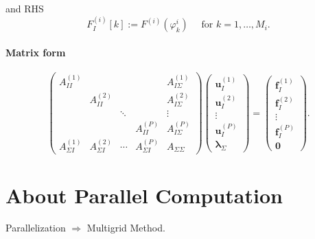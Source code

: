 and RHS
$$F_{I}^{(i)}[k]:=F^{(i)}\left(\varphi_{k}^{i}\right) \quad \text { for } k=1, \ldots, M_{i} .$$

\paragraph*{Matrix form}
$$\left(\begin{array}{ccccc}
    A_{I I}^{(1)} & & & & A_{I \Sigma}^{(1)} \\
    & A_{I I}^{(2)} & & & A_{I \Sigma}^{(2)} \\
    & & \ddots & & \vdots \\
    & & & A_{I I}^{(P)} & A_{I \Sigma}^{(P)} \\
    A_{\Sigma I}^{(1)} & A_{\Sigma I}^{(2)} & \cdots & A_{\Sigma I}^{(P)} & A_{\Sigma \Sigma}
    \end{array}\right)\left(\begin{array}{c}
    \boldsymbol{u}_{I}^{(1)} \\
    \boldsymbol{u}_{I}^{(2)} \\
    \vdots \\
    \boldsymbol{u}_{I}^{(P)} \\
    \boldsymbol{\lambda}_{\Sigma}
    \end{array}\right)=\left(\begin{array}{c}
    \boldsymbol{f}_{I}^{(1)} \\
    \boldsymbol{f}_{I}^{(2)} \\
    \vdots \\
    \boldsymbol{f}_{I}^{(P)} \\
    \mathbf{0}
\end{array}\right) .$$
    

\section{About Parallel Computation}
Parallelization $\Rightarrow$ Multigrid Method.


